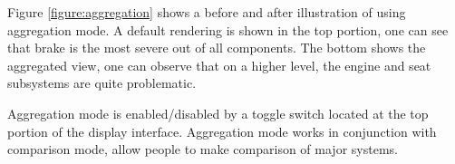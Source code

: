 
Figure \ref{figure:aggregation} shows a before and after illustration of using
aggregation mode. A default rendering is shown in the top portion, one can see
that brake is the most severe out of all components. The bottom shows the
aggregated view, one can observe that on a higher level, the engine and seat
subsystems are quite problematic.
 
Aggregation mode is enabled/disabled by a toggle switch located at the top
portion of the display interface. Aggregation mode works in
conjunction with comparison mode, allow people to make comparison of major
systems.

